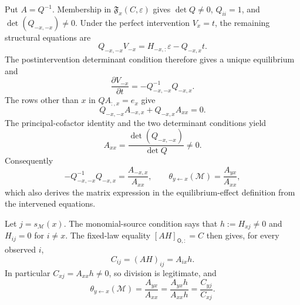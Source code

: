 Put \(A=Q^{-1}\). Membership in \(\mathfrak F_x(C,\varepsilon)\) gives \(\det Q\ne0\), \(Q_{ii}=1\), and \(\det(Q_{-x,-x})\ne0\). Under the perfect intervention \(V_x=t\), the remaining structural equations are
\[
 Q_{-x,-x}V_{-x}=H_{-x,:}\varepsilon-Q_{-x,x}t.
\]
The postintervention determinant condition therefore gives a unique equilibrium and
\[
 \frac{\partial V_{-x}}{\partial t}=-Q_{-x,-x}^{-1}Q_{-x,x}.
\]
The rows other than \(x\) in \(QA_{:,x}=e_x\) give
\[
 Q_{-x,-x}A_{-x,x}+Q_{-x,x}A_{xx}=0.
\]
The principal-cofactor identity and the two determinant conditions yield
\[
 A_{xx}=\frac{\det(Q_{-x,-x})}{\det Q}\ne0.
\]
Consequently
\[
 -Q_{-x,-x}^{-1}Q_{-x,x}=\frac{A_{-x,x}}{A_{xx}},
 \qquad
 \theta_{y\leftarrow x}(\mathcal M)=\frac{A_{yx}}{A_{xx}},
\]
which also derives the matrix expression in the equilibrium-effect definition from the intervened equations.

Let \(j=s_{\mathcal M}(x)\). The monomial-source condition says that \(h:=H_{xj}\ne0\) and \(H_{ij}=0\) for \(i\ne x\). The fixed-law equality \([AH]_{\mathsf O,:}=C\) then gives, for every observed \(i\),
\[
 C_{ij}=(AH)_{ij}=A_{ix}h.
\]
In particular \(C_{xj}=A_{xx}h\ne0\), so division is legitimate, and
\[
 \theta_{y\leftarrow x}(\mathcal M)
 =\frac{A_{yx}}{A_{xx}}
 =\frac{A_{yx}h}{A_{xx}h}
 =\frac{C_{yj}}{C_{xj}}.
\]